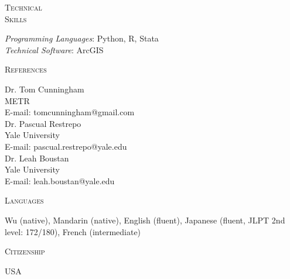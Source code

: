 \documentclass[10pt]{article}
\newlength{\labelcol}\setlength{\labelcol}{1.15in}
\newlength{\contentcol}\setlength{\contentcol}{\dimexpr\textwidth-\labelcol-0.15in\relax}
\newcommand{\cvsection}[2]{%
  \par\vspace{10pt}%
  \begin{minipage}[t]{\labelcol}\textsc{#1}\end{minipage}\hfill
  \begin{minipage}[t]{\contentcol}#2\end{minipage}\par}
\begin{document}
\cvsection{Technical\\Skills}{%
  \textit{Programming Languages}: Python, R, Stata\\
  \textit{Technical Software}: ArcGIS}

\cvsection{References}{%
  Dr. Tom Cunningham\\
  METR\\
  E-mail: tomcunningham@gmail.com\\[6pt]
  Dr. Pascual Restrepo\\
  Yale University\\
  E-mail: pascual.restrepo@yale.edu\\[6pt]
  Dr. Leah Boustan\\
  Yale University\\
  E-mail: leah.boustan@yale.edu}

\cvsection{Languages}{%
  Wu (native), Mandarin (native), English (fluent), Japanese (fluent, JLPT 2nd level: 172/180), French (intermediate)}

\cvsection{Citizenship}{USA}
\end{document}
